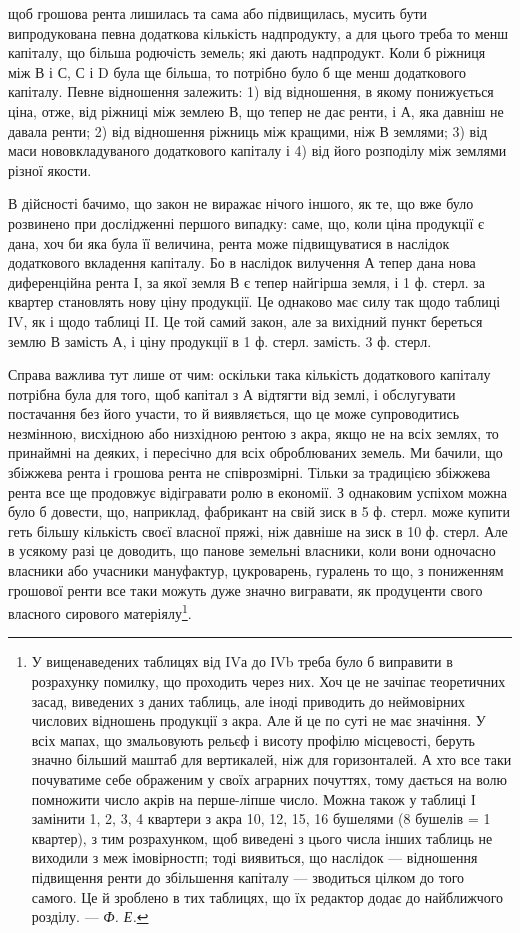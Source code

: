 \parcont{}  %
щоб грошова рента лишилась та сама або підвищилась, мусить бути випродукована
певна додаткова кількість надпродукту, а для цього треба то менш
капіталу, що більша родючість земель; які дають надпродукт. Коли б ріжниця
між В і С, С і D була ще більша, то потрібно було б ще менш додаткового
капіталу. Певне відношення залежить: 1) від відношення, в якому понижується
ціна, отже, від ріжниці між землею В, що тепер не дає ренти, і А, яка давніш
не давала ренти; 2) від відношення ріжниць між кращими, ніж В землями; 3) від
маси нововкладуваного додаткового капіталу і 4) від його розподілу між землями
різної якости.

В дійсності бачимо, що закон не виражає нічого іншого, як те, що вже
було розвинено при дослідженні першого випадку: саме, що, коли ціна продукції
є дана, хоч би яка була її величина, рента може підвищуватися в наслідок
додаткового вкладення капіталу. Бо в наслідок вилучення А тепер дана нова диференційна
рента І, за якої земля В є тепер найгірша земля, і 1  ф. стерл. за
квартер становлять нову ціну продукції. Це однаково має силу так щодо таблиці
IV, як і щодо таблиці II. Це той самий закон, але за вихідний
пункт береться землю В замість А, і ціну продукції в 1   ф. стерл. замість.
3 ф. стерл.

Справа важлива тут лише от чим: оскільки така кількість додаткового
капіталу потрібна була для того, щоб капітал з А відтягти від землі, і обслугувати
постачання без його участи, то й виявляється, що це може супроводитись
незмінною, висхідною або низхідною рентою з акра, якщо не на всіх землях, то
принаймні на деяких, і пересічно для всіх оброблюваних земель. Ми бачили, що
збіжжева рента і грошова рента не співрозмірні. Тільки за традицією збіжжева
рента все ще продовжує відігравати ролю в економії. З однаковим успіхом можна
було б довести, що, наприклад, фабрикант на свій зиск в 5 ф. стерл. може купити
геть більшу кількість своєї власної пряжі, ніж давніше на зиск в 10 ф. стерл.
Але в усякому разі це доводить, що панове земельні власники, коли вони одночасно
власники або учасники мануфактур, цукроварень, гуралень то що, з пониженням
грошової ренти все таки можуть дуже значно вигравати, як продуценти
свого власного сирового матеріялу\footnote{
У вищенаведених таблицях від IVа до ІVb треба було б виправити в розрахунку помилку, що
проходить через них. Хоч це не зачіпає теоретичних засад, виведених з даних таблиць, але іноді
приводить до неймовірних числових відношень продукції з акра. Але й це по суті не має значіння. У
всіх мапах, що змальовують рельєф і висоту профілю місцевості, беруть значно більший маштаб для
вертикалей, ніж для горизонталей. А хто все таки почуватиме себе ображеним у своїх аграрних
почуттях, тому дається на волю помножити число акрів на перше-ліпше число. Можна також у таблиці І
замінити 1, 2, 3, 4 квартери з акра 10, 12, 15, 16 бушелями (8 бушелів = 1 квартер), з тим
розрахунком, щоб виведені з цього числа інших таблиць не виходили з меж імовірностп; тоді виявиться,
що наслідок — відношення підвищення ренти до збільшення капіталу — зводиться цілком до того самого.
Це й зроблено в тих таблицях, що їх редактор додає до найближчого розділу. —\emph{ Ф. Е.}
}.

